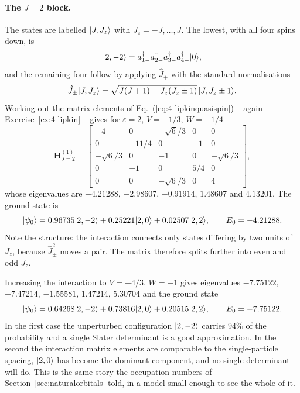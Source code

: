\paragraph{The $J=2$ block.}
The states are labelled $\vert J,J_z \rangle$ with $J_z=-J,\dots,J$.  The
lowest, with all four spins down, is
\begin{equation}
  \vert 2,-2 \rangle = a_{1-}^{\dagger}a_{2-}^{\dagger}
                a_{3-}^{\dagger}a_{4-}^{\dagger}\vert 0 \rangle,
  \label{eq:4-lipkinlowest}
\end{equation}
and the remaining four follow by applying $\hat{J}_+$ with the standard
normalisations
\begin{equation}
  \hat{J}_{\pm}\vert J,J_z \rangle
   = \sqrt{J(J+1)-J_z(J_z\pm1)}\,\vert J,J_z\pm1 \rangle .
  \label{eq:4-ladder}
\end{equation}
Working out the matrix elements of
Eq.~(\ref{eq:4-lipkinquasispin}) -- again Exercise~\ref{ex:4-lipkin} -- gives
for $\varepsilon=2$, $V=-1/3$, $W=-1/4$
\begin{equation}
  \bm{H}_{J=2}^{(1)} =
  \begin{bmatrix}
    -4 & 0 & -\sqrt{6}/3 & 0 & 0\\
     0 & -11/4 & 0 & -1 & 0\\
    -\sqrt{6}/3 & 0 & -1 & 0 & -\sqrt{6}/3\\
     0 & -1 & 0 & 5/4 & 0\\
     0 & 0 & -\sqrt{6}/3 & 0 & 4
  \end{bmatrix},
  \label{eq:4-lipkinmatrix1}
\end{equation}
whose eigenvalues are $-4.21288$, $-2.98607$, $-0.91914$, $1.48607$ and
$4.13201$.  The ground state is
\begin{equation}
  \vert \psi_0 \rangle = 0.96735\vert 2,-2 \rangle + 0.25221\vert 2,0 \rangle
                + 0.02507\vert 2,2 \rangle,
  \qquad E_0 = -4.21288 .
  \label{eq:4-lipkinground1}
\end{equation}
Note the structure: the interaction connects only states differing by two
units of $J_z$, because $\hat{J}_{\pm}^2$ moves a pair.  The matrix therefore
splits further into even and odd $J_z$.

Increasing the interaction to $V=-4/3$, $W=-1$ gives eigenvalues $-7.75122$,
$-7.47214$, $-1.55581$, $1.47214$, $5.30704$ and the ground state
\begin{equation}
  \vert \psi_0 \rangle = 0.64268\vert 2,-2 \rangle + 0.73816\vert 2,0 \rangle
                + 0.20515\vert 2,2 \rangle,
  \qquad E_0 = -7.75122 .
  \label{eq:4-lipkinground2}
\end{equation}
In the first case the unperturbed configuration $\vert 2,-2 \rangle$ carries $94\%$
of the probability and a single Slater determinant is a good approximation.
In the second the interaction matrix elements are comparable to the
single-particle spacing, $\vert 2,0 \rangle$ has become the dominant component, and
no single determinant will do.  This is the same story the occupation numbers
of Section~\ref{sec:naturalorbitals} told, in a model small enough to see the
whole of it.

